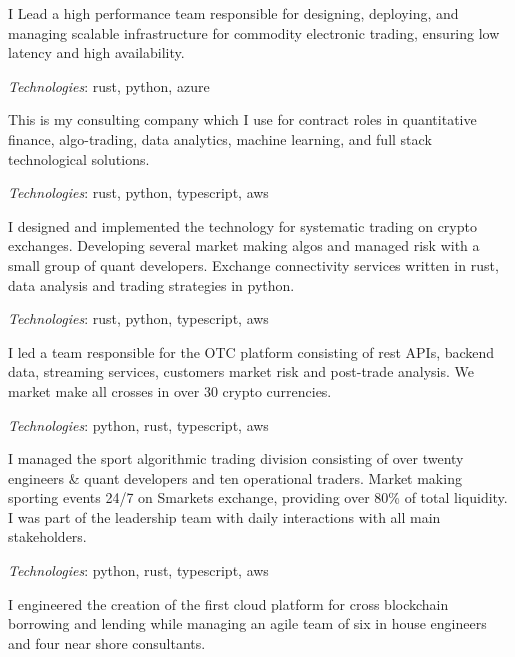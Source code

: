 
I Lead a high performance team responsible for designing, deploying, and managing scalable infrastructure
for commodity electronic trading, ensuring low latency and high availability.

{\it Technologies}: rust, python, azure


This is my consulting company which I use for contract roles in quantitative finance,
algo-trading, data analytics, machine learning, and full stack technological solutions.

{\it Technologies}: rust, python, typescript, aws


I designed and implemented the technology for systematic trading on crypto exchanges.
Developing several market making algos and managed risk with a small group of quant developers.
Exchange connectivity services written in rust, data analysis and trading strategies in python.

{\it Technologies}: rust, python, typescript, aws


I led a team responsible for the OTC platform consisting of rest APIs,
backend data, streaming services, customers market risk and post-trade analysis.
We market make all crosses in over 30 crypto currencies.

{\it Technologies}: python, rust, typescript, aws


I managed the sport algorithmic trading division consisting of over twenty engineers \& quant developers and ten operational traders.
Market making sporting events 24/7 on Smarkets exchange, providing over 80\% of total liquidity.
I was part of the leadership team with daily interactions with all main stakeholders.

{\it Technologies}: python, rust, typescript, aws


I engineered the creation of the first cloud platform for cross blockchain borrowing and lending
while managing an agile team of six in house engineers and four near shore consultants.

